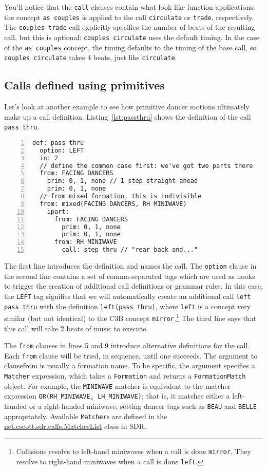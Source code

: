 \documentclass[12pt]{article}
\newcommand{\clause}[1]{\texttt{#1}}
\newcommand{\expr}[1]{\texttt{#1}}
\renewcommand{\call}[1]{\texttt{#1}} %
\newcommand{\package}[1]{\url{#1}}
\begin{document}
You'll notice that the \clause{call} clauses contain what look like
function applications: the concept \call{as couples} is applied to
the call \call{circulate} or \call{trade}, respectively.  The
\call{couples trade} call explicitly specifies the number of beats of
the resulting call, but this is optional: \call{couples circulate}
uses the default timing.  In the case of the \call{as couples}
concept, the timing defaults to the timing of the base call, so
\call{couples circulate} takes 4 beats, just like \call{circulate}.

\subsection{Calls defined using primitives}
Let's look at another example to see how primitive dancer motions
ultimately make up a call definition.  Listing~\ref{lst:passthru}
shows the definition of the call \call{pass thru}.

\begin{lstlisting}[numbers=left,float,caption=A definition with primitives.,label=lst:passthru]
def: pass thru
  option: LEFT
  in: 2
  // define the common case first: we've got two parts there
  from: FACING DANCERS
    prim: 0, 1, none // 1 step straight ahead
    prim: 0, 1, none
  // from mixed formation, this is indivisible
  from: mixed(FACING DANCERS, RH MINIWAVE)
    ipart:
      from: FACING DANCERS
        prim: 0, 1, none
        prim: 0, 1, none
      from: RH MINIWAVE
        call: step thru // "rear back and..."
\end{lstlisting}

The first line introduces the definition and names the call.
The \clause{option} clause in the second line
contains a set of comma-separated tags which are used as hooks to trigger
the creation of additional call definitions or grammar rules.
In this case, the \texttt{LEFT} tag signifies that we will
automatically create an additional call \call{left pass thru} with
the definition \expr{left(pass thru)}, where \call{left} is a
concept very similar (but not identical) to the C3B concept
\call{mirror}.\footnote{Collisions resolve to left-hand miniwaves when
  a call is done \call{mirror}.  They resolve to right-hand miniwaves
  when a call is done \call{left}.}
The third line says that this call will take 2 beats of music to execute.

The \clause{from} clauses in lines 5 and 9 introduce alternative
definitions for the call.  Each \clause{from} clause will be tried, in
sequence, until one succeeds.  The argument to clause{from} is
usually a formation name.  To be specific, the argument specifies a
\texttt{Matcher} expression, which takes a \texttt{Formation} and
returns a \texttt{FormationMatch} object.  For example, the
\texttt{MINIWAVE} matcher is equivalent to the matcher expression
\expr{OR(RH\_MINIWAVE, LH\_MINIWAVE)}; that is, it matches either a
left-handed or a right-handed miniwave, setting dancer tags such as
\texttt{BEAU} and \texttt{BELLE} appropriately.  Available
\texttt{Matcher}s are defined in the
\package{net.cscott.sdr.calls.MatcherList} class in SDR.
\end{document}
